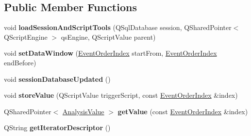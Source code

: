 \subsection*{Public Member Functions}
\begin{DoxyCompactItemize}
\item 
\hypertarget{class_picto_1_1_analysis_data_source_dep_a016c88a529e848d251dfc2b4be85eea2}{void {\bfseries load\-Session\-And\-Script\-Tools} (Q\-Sql\-Database session, Q\-Shared\-Pointer$<$ Q\-Script\-Engine $>$ qs\-Engine, Q\-Script\-Value parent)}\label{class_picto_1_1_analysis_data_source_dep_a016c88a529e848d251dfc2b4be85eea2}

\item 
\hypertarget{class_picto_1_1_analysis_data_source_dep_a9eb10a9335419f3d4b1d4ba676dd268b}{void {\bfseries set\-Data\-Window} (\hyperlink{class_picto_1_1_event_order_index}{Event\-Order\-Index} start\-From, \hyperlink{class_picto_1_1_event_order_index}{Event\-Order\-Index} end\-Before)}\label{class_picto_1_1_analysis_data_source_dep_a9eb10a9335419f3d4b1d4ba676dd268b}

\item 
\hypertarget{class_picto_1_1_analysis_data_source_dep_afb1c2936c4f869102f8e7e641978306b}{void {\bfseries session\-Database\-Updated} ()}\label{class_picto_1_1_analysis_data_source_dep_afb1c2936c4f869102f8e7e641978306b}

\item 
\hypertarget{class_picto_1_1_analysis_data_source_dep_a9bb78b236b978ecba5d08a25e28302f3}{void {\bfseries store\-Value} (Q\-Script\-Value trigger\-Script, const \hyperlink{class_picto_1_1_event_order_index}{Event\-Order\-Index} \&index)}\label{class_picto_1_1_analysis_data_source_dep_a9bb78b236b978ecba5d08a25e28302f3}

\item 
\hypertarget{class_picto_1_1_analysis_data_source_dep_a5208a24ec325832323de1192e1e0fdc0}{Q\-Shared\-Pointer$<$ \hyperlink{struct_picto_1_1_analysis_value}{Analysis\-Value} $>$ {\bfseries get\-Value} (const \hyperlink{class_picto_1_1_event_order_index}{Event\-Order\-Index} \&index)}\label{class_picto_1_1_analysis_data_source_dep_a5208a24ec325832323de1192e1e0fdc0}

\item 
\hypertarget{class_picto_1_1_analysis_data_source_dep_ae5013a6029536005cbdec429773149e6}{Q\-String {\bfseries get\-Iterator\-Descriptor} ()}\label{class_picto_1_1_analysis_data_source_dep_ae5013a6029536005cbdec429773149e6}


\end{DoxyCompactItemize}

